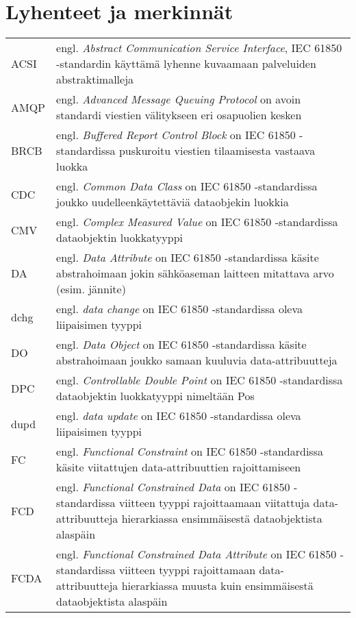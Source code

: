 \chapter*{Lyhenteet ja merkinnät}
\label{ch:lyhenteetjamerkinnat}
\begin{tabularx}{\linewidth}[h]{@{} p{} p{} @{}}
	ACSI & engl. \emph{Abstract Communication Service Interface}, IEC 61850 -standardin käyttämä lyhenne kuvaamaan palveluiden abstraktimalleja \\
	AMQP & engl. \emph{Advanced Message Queuing Protocol} on avoin standardi viestien välitykseen eri osapuolien kesken \\
	BRCB & engl. \emph{Buffered Report Control Block} on IEC 61850 -standardissa puskuroitu viestien tilaamisesta vastaava luokka \\
	CDC & engl. \emph{Common Data Class} on IEC 61850 -standardissa joukko uudelleenkäytettäviä dataobjekin luokkia \\
	CMV & engl. \emph{Complex Measured Value} on IEC 61850 -standardissa dataobjektin luokkatyyppi \\
	DA & engl. \emph{Data Attribute} on IEC 61850 -standardissa käsite abstrahoimaan jokin sähköaseman laitteen mitattava arvo (esim. jännite) \\
	dchg & engl. \emph{data change} on IEC 61850 -standardissa oleva liipaisimen tyyppi \\
	DO & engl. \emph{Data Object} on IEC 61850 -standardissa käsite abstrahoimaan joukko samaan kuuluvia data-attribuutteja \\
	DPC & engl. \emph{Controllable Double Point} on IEC 61850 -standardissa dataobjektin luokkatyyppi nimeltään Pos \\
	dupd & engl. \emph{data update} on IEC 61850 -standardissa oleva liipaisimen tyyppi \\
	FC & engl. \emph{Functional Constraint} on IEC 61850 -standardissa käsite viitattujen data-attribuuttien rajoittamiseen \\
	FCD & engl. \emph{Functional Constrained Data} on IEC 61850 -standardissa viitteen tyyppi rajoittaamaan viitattuja data-attribuutteja hierarkiassa ensimmäisestä dataobjektista alaspäin \\
	FCDA & engl. \emph{Functional Constrained Data Attribute} on IEC 61850 -standardissa viitteen tyyppi rajoittamaan data-attribuutteja hierarkiassa muusta kuin ensimmäisestä dataobjektista alaspäin \\

\end{tabularx}
